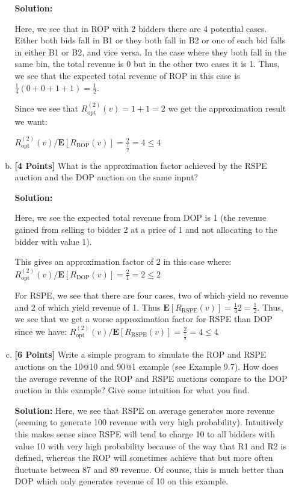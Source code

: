 \documentclass[11pt]{article}
\newcommand{\points}[1]{\textbf{[#1 Points]}}
\begin{document}
\begin{enumerate}[1.]
\begin{enumerate}[(a)]
  \textbf{Solution:}

  Here, we see that in ROP with 2 bidders there are 4 potential cases.  Either both bids fall in B1 or they both fall in B2 or one of each bid falls in either B1 or B2, and vice versa.  In the case where they both fall in the same bin, the total revenue is 0 but in the other two cases it is 1.  Thus, we see that the expected total revenue of ROP in this case is $\frac{1}{4} (0 + 0+1+1) = \frac{1}{2}$.

  Since we see that $R_{\mathrm{opt}}^{(2)}(v) = 1 + 1 = 2$ we get the approximation result we want:

  $R_{\mathrm{opt}}^{(2)}(v)/
\mathbf{E}[R_{\mathrm{ROP}}(v)] = \frac{2}{\frac{1}{2}} = 4 \leq 4$


\item \points{4} What is the approximation factor achieved by the RSPE
  auction and the DOP auction on the same input?

  \textbf{Solution:}

  Here, we see the expected total revenue from DOP is 1 (the revenue gained from selling to bidder 2 at a price of 1 and not allocating to the bidder with value 1).

  This gives an approximation factor of 2 in this case where: $R_{\mathrm{opt}}^{(2)}(v)/
\mathbf{E}[R_{\mathrm{DOP}}(v)] = \frac{2}{1} = 2 \leq 2$

For RSPE, we see that there are four cases, two of which yield no revenue and 2 of which yield revenue of 1. Thus $\mathbf{E}[R_{\mathrm{RSPE}}(v)] = \frac{1}{4} 2 = \frac{1}{2}$.  Thus, we see that we get a worse approximation factor for RSPE than DOP since we have: $R_{\mathrm{opt}}^{(2)}(v)/
\mathbf{E}[R_{\mathrm{RSPE}}(v)] = \frac{2}{\frac{1}{2}} = 4 \leq 4$



%
\item \points{6} Write a simple program to simulate the ROP and RSPE
  auctions on the 10@10 and 90@1 example (see Example 9.7).  How does
  the average revenue of the ROP and RSPE auctions compare to the DOP
  auction in this example? Give some intuition for what you find.

\textbf{Solution:}
Here, we see that RSPE on average generates more revenue (seeming to generate 100 revenue with very high probability). Intuitively this makes sense since RSPE will tend to charge 10 to all bidders with value 10 with very high probability because of the way that R1 and R2 is defined, whereas the ROP will sometimes achieve that but more often fluctuate between 87 and 89 revenue. Of course, this is much better than DOP which only generates revenue of 10 on this example.


\end{enumerate}
\end{enumerate}
\end{document}
